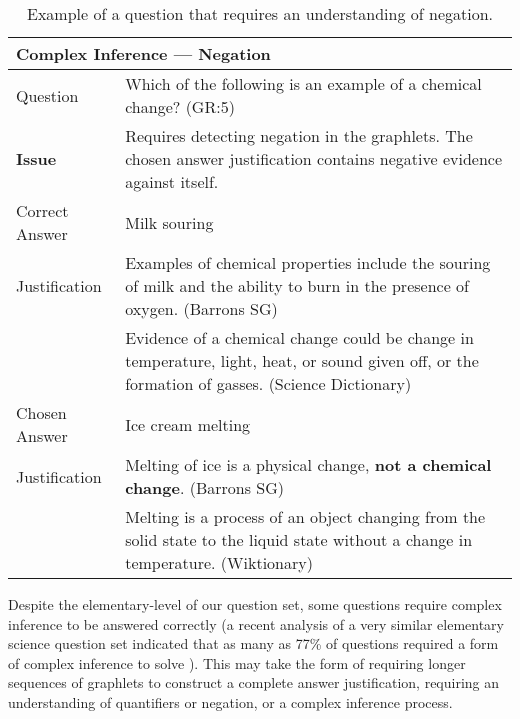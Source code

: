 \begin{table}[]
\begin{footnotesize}
\begin{tabularx}{\textwidth}{p{2.5cm}p{10cm}}
\hline
\multicolumn{2}{l}{Complex Inference --- Negation} \\
\hline
Question & Which of the following is an example of a chemical change? (GR:5)  \\
\textbf{Issue}			&  Requires detecting negation in the graphlets.  The chosen answer justification contains negative evidence against itself. \\
\hline
Correct Answer &  Milk souring\\
Justification 	& Examples of chemical properties include the souring of milk and the ability to burn in the presence of oxygen. (Barrons SG)\\
 				& Evidence of a chemical change could be change in temperature, light, heat, or sound given off, or the formation of gasses. (Science Dictionary)\\
\hline
Chosen Answer & Ice cream melting\\
Justification 	& Melting of ice is a physical change, {\bf not a chemical change}. (Barrons SG)\\
 	& Melting is a process of an object changing from the solid state to the liquid state without a change in temperature. (Wiktionary)\\
\hline
\end{tabularx}
\end{footnotesize}
\caption{{  Example of a question that requires an understanding of negation. }} 
\label{ex:negations}

\end{table}



{}
Despite the elementary-level of our question set, some questions require complex inference to be answered correctly (a recent analysis of a very similar elementary science question set indicated that as many as 77\% of questions required a form of complex inference to solve \citep{jansen-EtAl:2016:COLING}).  This may take the form of requiring longer sequences of graphlets to construct a complete answer justification, requiring an understanding of quantifiers or negation, or a complex inference process. 

